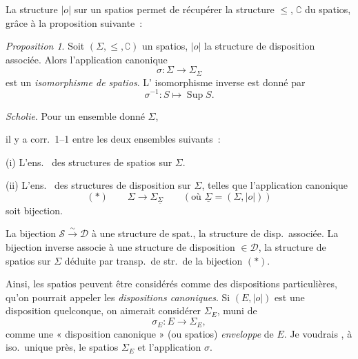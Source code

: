 \documentclass[11pt,a4paper]{article}
\begin{document}
La structure $\mathrel{|o|}$ sur un spatios permet de récupérer la structure $\leq$, $\complement$ du spatios, grâce à la proposition suivante~:

\emph{Proposition 1}. Soit $(\Sigma, \leq, \complement)$ un spatios, $\mathrel{|o|}$ la structure de disposition associée. Alors l'application canonique
\[ \sigma : \Sigma \longrightarrow \Sigma_{\Sigma} \]
 est un \emph{isomorphisme de spatios}.
L' isomorphisme inverse est donné par
\[ \sigma^{-1} : S \longmapsto \operatorname{Sup} S. \]

\emph{Scholie}. Pour un ensemble donné $\Sigma$,

il y a corr.\ 1--1 entre les deux ensembles suivants~:

(i) L'ens.\  des structures de spatios \add{$(\leq, \complement)$} sur $\Sigma$.

(ii) L'ens.\  des structures de disposition  sur $\Sigma$, telles que l'application canonique
\[ (*) \qquad \Sigma \longrightarrow \Sigma_{\underline{\Sigma}} \qquad (\text{où } \underline{\Sigma} = (\Sigma, |o|)) \]
soit bijection.

 La bijection $\mathcal{S} \xrightarrow{\ \sim\ } \mathcal{D}$    à une structure de spat., la structure de disp.\ associée. La bijection inverse associe à une structure de disposition $\in \mathcal{D}$, la structure de spatios sur $\Sigma$ déduite par transp.\ de str.\ de la bijection $(*)$.

Ainsi, les spatios peuvent être considérés comme des dispositions particulières, qu'on pourrait appeler les \emph{dispositions canoniques}. Si $(E, |o|)$ est une disposition quelconque, on aimerait considérer $\Sigma_E$, muni de
\[ \sigma_E : E \longrightarrow \Sigma_E, \]
comme une « disposition canonique » (ou spatios) \emph{enveloppe} de $E$. Je voudrais , à iso.\ unique près, le spatios $\Sigma_E$ et l'application $\sigma$.
\end{document}
